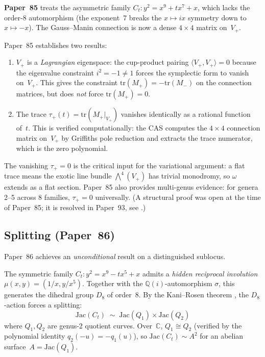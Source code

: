 \documentclass[11pt]{article}
\theoremstyle{plain}
\theoremstyle{definition}
\theoremstyle{remark}
\newcommand{\QQ}{\mathbb{Q}}
\newcommand{\CC}{\mathbb{C}}
\newcommand{\tr}{\mathrm{tr}}
\newcommand{\Jac}{\mathrm{Jac}}
\begin{document}
\medskip
\noindent\textbf{Paper~85} \cite{p85} treats the asymmetric family
$C_t: y^2 = x^9 + tx^7 + x$, which lacks the order-8 automorphism
(the exponent~7 breaks the $x \mapsto ix$ symmetry down to
$x \mapsto -x$).  The Gauss--Manin connection is now a dense
$4 \times 4$ matrix on~$V_+$.

Paper~85 establishes two results:
\begin{enumerate}[label=(\roman*)]
\item $V_+$ is a \emph{Lagrangian} eigenspace: the cup-product
  pairing $\langle V_+, V_+ \rangle = 0$ because the eigenvalue
  constraint $i^2 = -1 \neq 1$ forces the symplectic form to vanish
  on~$V_+$.  This gives the constraint $\tr(M_+) = -\tr(M_-)$ on
  the connection matrices, but does \emph{not} force $\tr(M_+) = 0$.

\item The trace $\tau_+(t) = \tr(M_+|_{V_+})$ vanishes identically
  as a rational function of~$t$.  This is verified computationally:
  the CAS computes the $4 \times 4$ connection matrix on~$V_+$ by
  Griffiths pole reduction and extracts the trace numerator, which
  is the zero polynomial.
\end{enumerate}

The vanishing $\tau_+ = 0$ is the critical input for the variational
argument: a flat trace means the exotic line bundle
$\bigwedge^4(V_+)$ has trivial monodromy, so $\omega$ extends as a
flat section.  Paper~85 also provides multi-genus evidence: for
genera 2--5 across 8 families, $\tau_+ = 0$ universally.  (A
structural proof was open at the time of Paper~85; it is resolved
in Paper~93, see .)


\subsection{Splitting (Paper~86)}

Paper~86 \cite{p86} achieves an \emph{unconditional} result on a
distinguished sublocus.

The symmetric family $C_t: y^2 = x^9 - tx^5 + x$ admits a
\emph{hidden reciprocal involution} $\mu(x,y) = (1/x, y/x^5)$.
Together with the $\QQ(i)$-automorphism $\sigma$, this generates
the dihedral group $D_8$ of order~8.  By the Kani--Rosen theorem
\cite{kani-rosen}, the $D_8$-action forces a splitting:
\[
  \Jac(C_t) \;\sim\; \Jac(Q_1) \times \Jac(Q_2)
\]
where $Q_1, Q_2$ are genus-2 quotient curves.  Over~$\CC$,
$Q_1 \cong Q_2$ (verified by the polynomial identity
$q_2(-u) = -q_1(u)$), so $\Jac(C_t) \sim A^2$ for an abelian
surface~$A = \Jac(Q_1)$.
\end{document}
